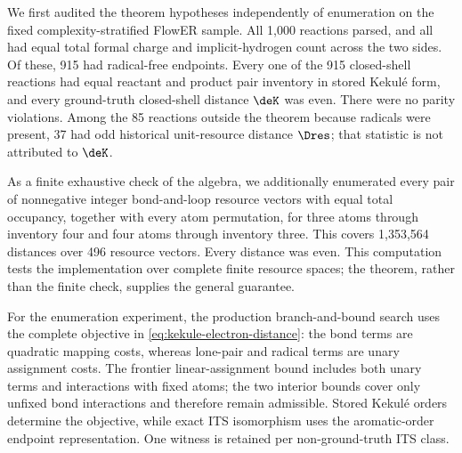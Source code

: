 We first audited the theorem hypotheses independently of enumeration on the
fixed complexity-stratified FlowER sample.  All 1,000 reactions parsed, and
all had equal total formal charge and implicit-hydrogen count across the two
sides.  Of these, 915 had radical-free endpoints.  Every one of the 915
closed-shell reactions had equal reactant and product pair inventory in
stored Kekul\'e form, and every ground-truth closed-shell distance \(\deK\)
was even.  There were no parity violations.  Among the 85 reactions outside
the theorem because radicals were present, 37 had odd historical
unit-resource distance \(\Dres\); that statistic is not attributed to
\(\deK\).

As a finite exhaustive check of the algebra, we additionally enumerated every
pair of nonnegative integer bond-and-loop resource vectors with equal total
occupancy, together with every atom permutation, for three atoms through
inventory four and four atoms through inventory three.  This covers
1,353,564 distances over 496 resource vectors.  Every distance was even.
This computation tests the implementation over complete finite resource
spaces; the theorem, rather than the finite check, supplies the general
guarantee.

For the enumeration experiment, the production branch-and-bound search uses
the complete objective in \cref{eq:kekule-electron-distance}: the bond terms are
quadratic mapping costs, whereas lone-pair and radical terms are unary
assignment costs.  The frontier linear-assignment bound includes both unary
terms and interactions with fixed atoms; the two interior bounds cover only
unfixed bond interactions and therefore remain admissible.  Stored Kekul\'e
orders determine the objective, while exact ITS isomorphism uses the
aromatic-order endpoint representation.  One witness is retained per
non-ground-truth ITS class.

